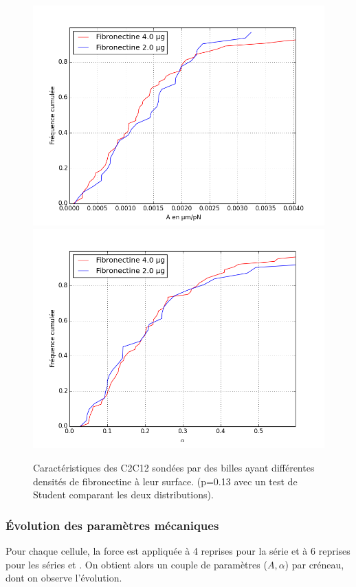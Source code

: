 \documentclass{report}
\begin{document}
\begin{figure}
\includegraphics[scale=0.5]{Figures/A_coating_seul.png} 
\includegraphics[scale=0.5]{Figures/E_coating_seul.png} 
\caption{Caractéristiques des C2C12 sondées par des billes ayant différentes densités de fibronectine à leur surface. (p=0.13 avec un test de Student comparant les deux distributions). }
\end{figure}

\subsubsection{\'Evolution des paramètres mécaniques}

Pour chaque cellule, la force est appliquée à 4 reprises pour la série  et à 6 reprises pour les séries  et . On obtient alors un couple de paramètres ($A,\alpha$) par créneau, dont on observe l'évolution. 
\end{document}
